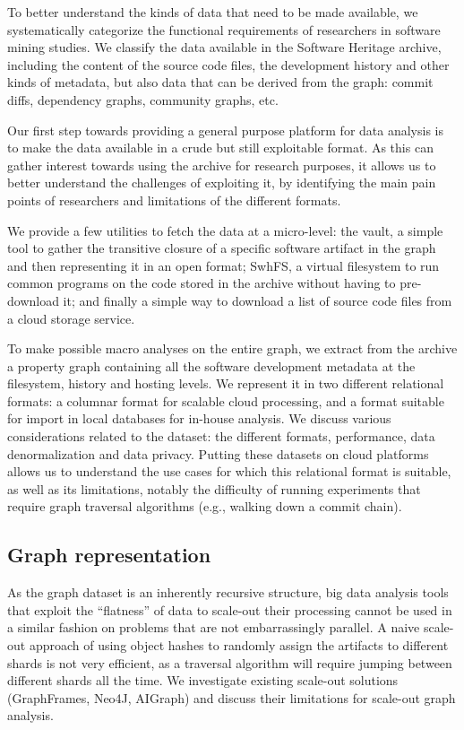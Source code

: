 To better understand the kinds of data that need to be made available, we
systematically categorize the functional requirements of researchers in
software mining studies.  We classify the data available in the Software
Heritage archive, including the content of the source code files, the
development history and other kinds of metadata, but also data that can be
derived from the graph: commit diffs, dependency graphs, community graphs, etc.

Our first step towards providing a general purpose platform for data analysis
is to make the data available in a crude but still exploitable format. As this
can gather interest towards using the archive for research purposes, it
allows us to better understand the challenges of exploiting it, by identifying
the main pain points of researchers and limitations of the different formats.

We provide a few utilities to fetch the data at a micro-level: the vault, a
simple tool to gather the transitive closure of a specific software artifact in
the graph and then representing it in an open format; SwhFS, a virtual
filesystem to run common programs on the code stored in the archive without
having to pre-download it; and finally a simple way to download a list of
source code files from a cloud storage service.

To make possible macro analyses on the entire graph, we extract from the
archive a property graph containing all the software development metadata at
the filesystem, history and hosting levels. We represent it in two different
relational formats: a columnar format for scalable cloud processing, and a
format suitable for import in local databases for in-house analysis. We discuss
various considerations related to the dataset: the different formats,
performance, data denormalization and data privacy.
Putting these datasets on cloud platforms allows us to understand the use cases
for which this relational format is suitable, as well as its limitations,
notably the difficulty of running experiments that require graph traversal
algorithms (e.g., walking down a commit chain).

\subsection*{Graph representation}

As the graph dataset is an inherently recursive structure, big data analysis
tools that exploit the ``flatness'' of data to scale-out their processing cannot
be used in a similar fashion on problems that are not embarrassingly parallel.
A naive scale-out approach of using object hashes to randomly assign the
artifacts to different shards is not very efficient, as a traversal algorithm
will require jumping between different shards all the time. We investigate
existing scale-out solutions (GraphFrames, Neo4J, AIGraph) and discuss their
limitations for scale-out graph analysis.

